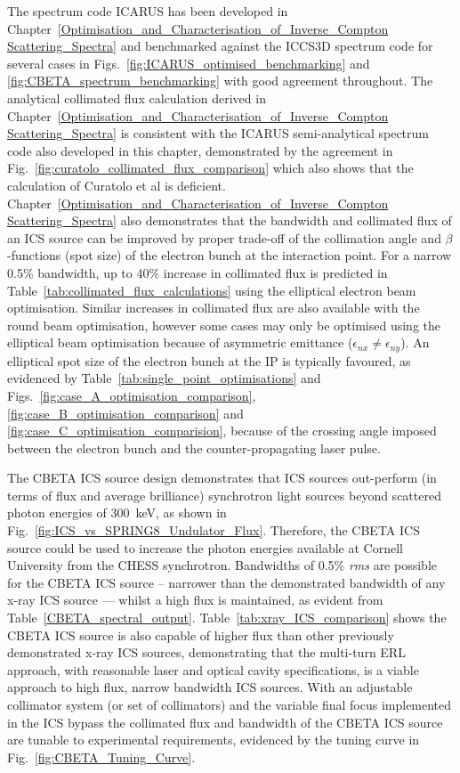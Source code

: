 \documentclass[../main.tex]{subfiles}
\begin{document}
The spectrum code \textsc{ICARUS} has been developed in Chapter~\ref{Optimisation_and_Characterisation_of_Inverse_Compton Scattering_Spectra} and benchmarked against the \textsc{ICCS3D} spectrum code for several cases in Figs.~\ref{fig:ICARUS_optimised_benchmarking} and \ref{fig:CBETA_spectrum_benchmarking} with good agreement throughout. The analytical collimated flux calculation derived in Chapter~\ref{Optimisation_and_Characterisation_of_Inverse_Compton Scattering_Spectra} is consistent with the \textsc{ICARUS} semi-analytical spectrum code also developed in this chapter, demonstrated by the agreement in Fig.~\ref{fig:curatolo_collimated_flux_comparison} which also shows that the calculation of Curatolo et al \cite{curatolo2017analytical} is deficient. Chapter~\ref{Optimisation_and_Characterisation_of_Inverse_Compton Scattering_Spectra} also demonstrates that the bandwidth and collimated flux of an ICS source can be improved by proper trade-off of the collimation angle and $\beta$-functions (spot size) of the electron bunch at the interaction point. For a narrow 0.5\% bandwidth, up to 40\% increase in collimated flux is predicted in Table~\ref{tab:collimated_flux_calculations} using the elliptical electron beam optimisation. Similar increases in collimated flux are also available with the round beam optimisation, however some cases may only be optimised using the elliptical beam optimisation because of asymmetric emittance ($\epsilon_{nx} \neq \epsilon_{ny}$). An elliptical spot size of the electron bunch at the IP is typically favoured, as evidenced by Table~\ref{tab:single_point_optimisations} and Figs.~\ref{fig:case_A_optimisation_comparison}, \ref{fig:case_B_optimisation_comparison} and \ref{fig:case_C_optimisation_comparision}, because of the crossing angle imposed between the electron bunch and the counter-propagating laser pulse. 

The CBETA ICS source design demonstrates that ICS sources out-perform (in terms of flux and average brilliance) synchrotron light sources beyond scattered photon energies of 300~\si{\kilo\electronvolt}, as shown in Fig.~\ref{fig:ICS_vs_SPRING8_Undulator_Flux}. Therefore, the CBETA ICS source could be used to increase the photon energies available at Cornell University from the CHESS synchrotron. Bandwidths of 0.5\% \textit{rms} are possible for the CBETA ICS source -- narrower than the demonstrated bandwidth of any x-ray ICS source --- whilst a high flux is maintained, as evident from Table~\ref{CBETA_spectral_output}. Table~\ref{tab:xray_ICS_comparison} shows the CBETA ICS source is also capable of higher flux than other previously demonstrated x-ray ICS sources, demonstrating that the multi-turn ERL approach, with reasonable laser and optical cavity specifications, is a viable approach to high flux, narrow bandwidth ICS sources. With an adjustable collimator system (or set of collimators) and the variable final focus implemented in the ICS bypass the collimated flux and bandwidth of the CBETA ICS source are tunable to experimental requirements, evidenced by the tuning curve in Fig.~\ref{fig:CBETA_Tuning_Curve}.   
\end{document}
